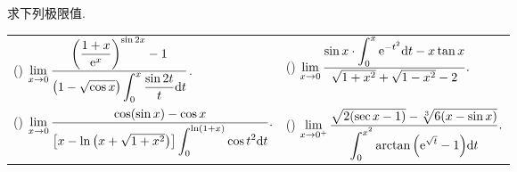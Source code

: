 \begin{example}
    求下列极限值.
    \setcounter{magicrownumbers}{0}
    \begin{table}[H]
        \centering
        \begin{tabular}{l | l}
            (\rownumber{}) $\displaystyle \lim_{x \to 0}\dfrac{\qty(\dfrac{1+x}{\mathrm{e} ^{x}})^{\sin 2x}-1}{\displaystyle \qty(1-\sqrt{\cos x})\int_{0}^{x} \dfrac{\sin 2t}{t} \dd t}$. & (\rownumber{}) $\displaystyle \lim_{x \to 0}\dfrac{\displaystyle \sin x\cdot \int_{0}^{x} \mathrm{e} ^{-t^2} \dd t-x\tan x}{\sqrt{1+x^2}+\sqrt{1-x^2}-2}.$          \\
            (\rownumber{}) $\displaystyle\lim_{x\to0}\dfrac{\cos(\sin x)-\cos x}{\qty[x-\ln\qty(x+\sqrt{1+x^2})]\displaystyle\int_{0}^{\ln(1+x)}\cos t^2\dd t}.$                   & (\rownumber{}) $\displaystyle\lim_{x\to0^+}\dfrac{\sqrt{2(\sec x-1)}-\sqrt[3]{6(x-\sin x)}}{\displaystyle\int_{0}^{x^2}\arctan\qty(\mathrm{e}^{\sqrt{t}}-1)\dd t}.$
        \end{tabular}
    \end{table}
\end{example}
